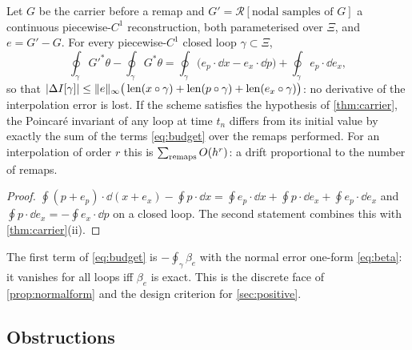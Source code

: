 \begin{theorem}\label{thm:budget}
Let $G$ be the carrier before a remap and $G'=\mathcal R[\text{nodal samples of }G]$ a continuous piecewise-$C^1$
reconstruction, both parameterised over $\Xi$, and $e=G'-G$. For every piecewise-$C^1$ closed loop $\gamma\subset\Xi$,
\begin{equation}\label{eq:budget}
\oint_\gamma G'^*\theta-\oint_\gamma G^*\theta=\oint_\gamma\big(e_p\cdot\dd x-e_x\cdot\dd p\big)+\oint_\gamma e_p\cdot\dd e_x ,
\end{equation}
so that
$\lvert \Delta I[\gamma]\rvert\le\lVert e\rVert_\infty\big(\operatorname{len}(x\circ\gamma)+\operatorname{len}(p\circ\gamma)+\operatorname{len}(e_x\circ\gamma)\big)$: no
derivative of the interpolation error is lost. If the scheme satisfies the hypothesis of \cref{thm:carrier}, the
Poincar\'e invariant of any loop at time $t_n$ differs from its initial value by exactly the sum of the terms
\eqref{eq:budget} over the remaps performed. For an interpolation of order $r$ this is
$\sum_{\rm remaps}O(h^{r})$: a drift proportional to the number of remaps.
\end{theorem}
\begin{proof}
$\oint(p+e_p)\cdot\dd(x+e_x)-\oint p\cdot\dd x=\oint e_p\cdot\dd x+\oint p\cdot\dd e_x+\oint e_p\cdot\dd e_x$ and
$\oint p\cdot\dd e_x=-\oint e_x\cdot\dd p$ on a closed loop. The second statement combines this with \cref{thm:carrier}(ii).
\end{proof}

The first term of \eqref{eq:budget} is $-\oint_\gamma\beta_e$ with the normal error one-form \eqref{eq:beta}: it
vanishes for all loops iff $\beta_e$ is exact. This is the discrete face of \cref{prop:normalform} and the design
criterion for \cref{sec:positive}.

\subsection{Obstructions}\label{sec:nogo}

